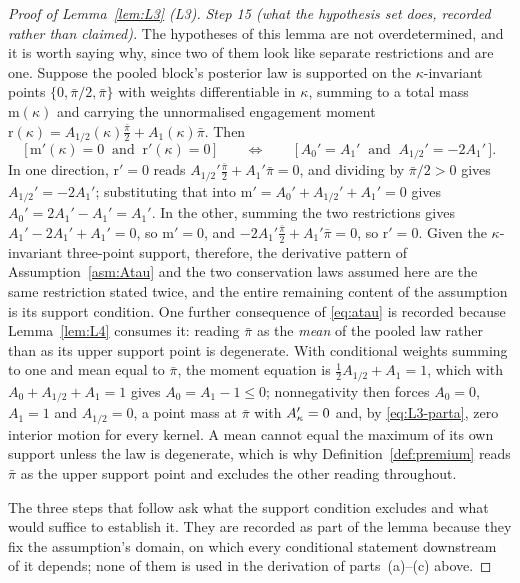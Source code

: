 \begin{proof}[Proof of Lemma~\ref{lem:L3} (L3)]
\emph{Step 15 (what the hypothesis set does, recorded rather than claimed).} The hypotheses of this
lemma are not overdetermined, and it is worth saying why, since two of them look like separate
restrictions and are one. Suppose the pooled block's posterior law is supported on the
$\kappa$-invariant points $\{0,\bar\pi/2,\bar\pi\}$ with weights differentiable in $\kappa$, summing
to a total mass $\mathrm{m}(\kappa)$ and carrying the unnormalised engagement moment
$\mathrm{r}(\kappa) = A_{1/2}(\kappa)\tfrac{\bar\pi}{2}+A_1(\kappa)\bar\pi$. Then
\begin{equation}
\label{eq:L3-equiv}
\bigl[\,\mathrm{m}'(\kappa) = 0 \ \text{ and }\ \mathrm{r}'(\kappa) = 0\,\bigr]
\qquad \Longleftrightarrow \qquad
\bigl[\,A_0' = A_1' \ \text{ and }\ A_{1/2}' = -2A_1'\,\bigr].
\end{equation}
In one direction, $\mathrm{r}' = 0$ reads $A_{1/2}'\tfrac{\bar\pi}{2}+A_1'\bar\pi = 0$, and dividing
by $\bar\pi/2 > 0$ gives $A_{1/2}' = -2A_1'$; substituting that into
$\mathrm{m}' = A_0'+A_{1/2}'+A_1' = 0$ gives $A_0' = 2A_1'-A_1' = A_1'$. In the other, summing the
two restrictions gives $A_1'-2A_1'+A_1' = 0$, so $\mathrm{m}' = 0$, and
$-2A_1'\tfrac{\bar\pi}{2}+A_1'\bar\pi = 0$, so $\mathrm{r}' = 0$. Given the $\kappa$-invariant
three-point support, therefore, the derivative pattern of Assumption~\ref{asm:Atau} and the two
conservation laws assumed here are the same restriction stated twice, and the entire remaining
content of the assumption is its support condition. One further consequence of \eqref{eq:atau} is
recorded because Lemma~\ref{lem:L4} consumes it: reading $\bar\pi$ as the \emph{mean} of the pooled
law rather than as its upper support point is degenerate. With conditional weights summing to one and
mean equal to $\bar\pi$, the moment equation is $\tfrac12 A_{1/2}+A_1 = 1$, which with
$A_0+A_{1/2}+A_1 = 1$ gives $A_0 = A_1-1 \le 0$; nonnegativity then forces $A_0 = 0$, $A_1 = 1$ and
$A_{1/2} = 0$, a point mass at $\bar\pi$ with $A'_{\kappa} = 0$ and, by \eqref{eq:L3-parta}, zero interior
motion for every kernel. A mean cannot equal the maximum of its own support unless the law is
degenerate, which is why Definition~\ref{def:premium} reads $\bar\pi$ as the upper support point and
excludes the other reading throughout.

The three steps that follow ask what the support condition excludes and what would suffice to
establish it. They are recorded as part of the lemma because they fix the assumption's domain, on
which every conditional statement downstream of it depends; none of them is used in the derivation
of parts~(a)--(c) above.


\end{proof}
